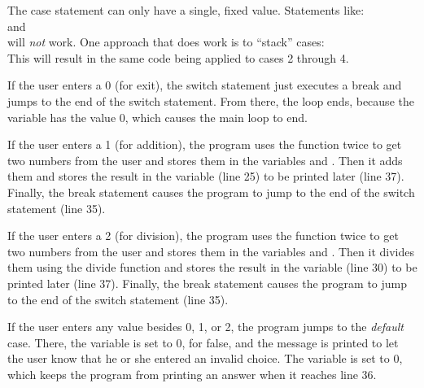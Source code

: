 The case statement can only have a single, fixed value.  Statements like:\\  and  \\will \emph{not} work.  One approach that does work is to ``stack'' cases:\\
This will result in the same code being applied to cases 2 through 4.

If the user enters a 0 (for exit), the switch statement just executes a break and jumps to the end of the switch statement.  From there, the  loop ends, because the variable  has the value 0, which causes the main loop to end.  %

If the user enters a 1 (for addition), the program uses the  function twice to get two numbers from the user and stores them in the variables  and .  Then it adds them and stores the result in the variable  (line 25) to be printed later (line 37).  Finally, the break statement causes the program to jump to the end of the switch statement (line 35).

If the user enters a 2 (for division), the program uses the  function twice to get two numbers from the user and stores them in the variables  and .  Then it divides them using the divide function and stores  the result in the variable  (line 30) to be printed later (line 37).  Finally, the break statement causes the program to jump to the end of the switch statement (line 35).


If the user enters any value besides 0, 1, or 2, the program jumps to the \emph{default} case.  There, the variable  is set to 0, for false, and the message  is printed to let the user know that he or she entered an invalid choice.  The variable  is set to 0, which keeps the program from printing an answer when it reaches line 36. 


